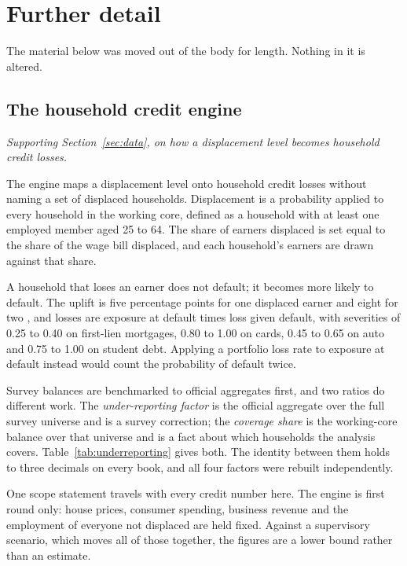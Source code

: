 \section{Further detail}
\label{app:detail}

The material below was moved out of the body for length. Nothing in it is altered.

\subsection{The household credit engine}

\emph{Supporting Section~\ref{sec:data}, on how a displacement level becomes household credit losses.}

The engine maps a displacement level onto household credit losses without naming a set of
displaced households. Displacement is a probability applied to every household in the working
core, defined as a household with at least one employed member aged 25 to 64. The share of
earners displaced is set equal to the share of the wage bill displaced, and each household's
earners are drawn against that share.

A household that loses an earner does not default; it becomes more likely to default. The
uplift is five percentage points for one displaced earner and eight for two
\citep{GerardiHerkenhoffOhanianWillen2018}, and losses are exposure at default times loss given
default, with severities of 0.25 to 0.40 on first-lien mortgages, 0.80 to 1.00 on cards, 0.45 to
0.65 on auto and 0.75 to 1.00 on student debt. Applying a portfolio loss rate to exposure at
default instead would count the probability of default twice.

Survey balances are benchmarked to official aggregates first, and two ratios do different work.
The \emph{under-reporting factor} is the official aggregate over the full survey universe and is a
survey correction; the \emph{coverage share} is the working-core balance over that universe and is
a fact about which households the analysis covers. Table~\ref{tab:underreporting} gives both. The
identity between them holds to three decimals on every book, and all four factors were rebuilt
independently.

One scope statement travels with every credit number here. The engine is first round only: house
prices, consumer spending, business revenue and the employment of everyone not displaced are held
fixed. Against a supervisory scenario, which moves all of those together, the figures are a lower
bound rather than an estimate.


